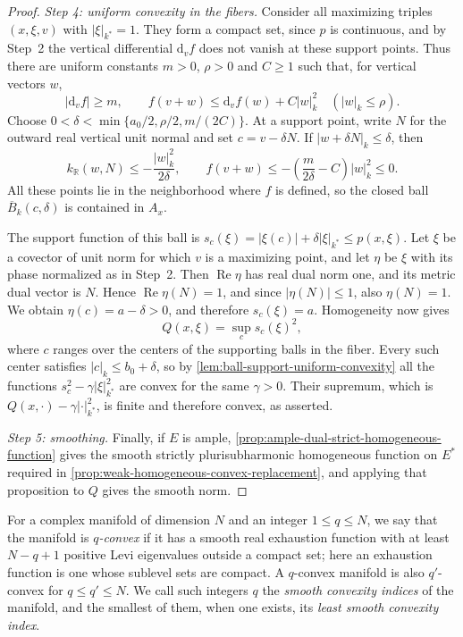 \begin{proof}
\emph{Step 4: uniform convexity in the fibers.} Consider all maximizing triples $(x,\xi,v)$ with $|\xi|_{k^*}=1$. They form a compact set, since $p$ is continuous, and by Step~2 the vertical differential $\mathrm d_vf$ does not vanish at these support points. Thus there are uniform constants $m>0$, $\rho>0$ and $C\geq1$ such that, for vertical vectors $w$,
\[
 |\mathrm d_vf|\geq m,\qquad
 f(v+w)\leq\mathrm d_vf(w)+C|w|_k^2\quad (|w|_k\leq\rho).
\]
Choose $0<\delta<\min\{a_0/2,\rho/2,m/(2C)\}$. At a support point, write $N$ for the outward real vertical unit normal and set $c=v-\delta N$. If $|w+\delta N|_k\leq\delta$, then
\[
 k_{\mathbb R}(w,N)\leq-\frac{|w|_k^2}{2\delta},\qquad
 f(v+w)\leq-\left(\frac{m}{2\delta}-C\right)|w|_k^2\leq0.
\]
All these points lie in the neighborhood where $f$ is defined, so the closed ball $\overline B_k(c,\delta)$ is contained in $A_x$.

The support function of this ball is $s_c(\xi)=|\xi(c)|+\delta|\xi|_{k^*}\leq p(x,\xi)$. Let $\xi$ be a covector of unit norm for which $v$ is a maximizing point, and let $\eta$ be $\xi$ with its phase normalized as in Step~2. Then $\operatorname{Re}\eta$ has real dual norm one, and its metric dual vector is $N$. Hence $\operatorname{Re}\eta(N)=1$, and since $|\eta(N)|\leq1$, also $\eta(N)=1$. We obtain $\eta(c)=a-\delta>0$, and therefore $s_c(\xi)=a$. Homogeneity now gives
\[
 Q(x,\xi)=\sup_c s_c(\xi)^2,
\]
where $c$ ranges over the centers of the supporting balls in the fiber. Every such center satisfies $|c|_k\leq b_0+\delta$, so by \cref{lem:ball-support-uniform-convexity} all the functions $s_c^2-\gamma|\xi|_{k^*}^2$ are convex for the same $\gamma>0$. Their supremum, which is $Q(x,\cdot)-\gamma|\cdot|_{k^*}^2$, is finite and therefore convex, as asserted.

\emph{Step 5: smoothing.} Finally, if $E$ is ample, \cref{prop:ample-dual-strict-homogeneous-function} gives the smooth strictly plurisubharmonic homogeneous function on $E^*$ required in \cref{prop:weak-homogeneous-convex-replacement}, and applying that proposition to $Q$ gives the smooth norm.
\end{proof}

For a complex manifold of dimension $N$ and an integer $1\leq q\leq N$, we say that the manifold is \emph{$q$-convex} if it has a smooth real exhaustion function with at least $N-q+1$ positive Levi eigenvalues outside a compact set; here an exhaustion function is one whose sublevel sets are compact. A $q$-convex manifold is also $q'$-convex for $q\leq q'\leq N$. We call such integers $q$ the \emph{smooth convexity indices} of the manifold, and the smallest of them, when one exists, its \emph{least smooth convexity index}.

